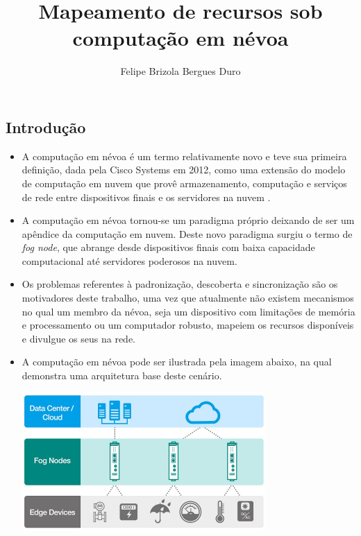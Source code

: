\documentclass[a0,portrait]{lab-poster}
\title{Mapeamento de recursos sob computação em névoa}
\author{Felipe Brizola Bergues Duro}
\begin{document}
\maketitle


\begin{multicols}{2} 
\section*{Introdução}
\Large
\justifying
\begin{itemize}

\item A computação em névoa é um termo relativamente novo e teve sua primeira definição, dada pela Cisco Systems em 2012, como uma extensão do modelo de computação em nuvem que provê armazenamento, computação e serviços de rede entre dispositivos finais e os servidores na nuvem \cite{DBLP:journals/corr/RomanLM16}.
\item A computação em névoa tornou-se um paradigma próprio deixando de ser um apêndice da computação em nuvem. Deste novo paradigma surgiu o termo de \textit{fog node}, que abrange desde dispositivos finais com baixa capacidade computacional até servidores poderosos na nuvem.
\item Os problemas referentes à padronização, descoberta e sincronização são os motivadores deste trabalho, uma vez que atualmente não existem mecanismos no qual um membro da névoa, seja um dispositivo com limitações de memória e processamento ou um computador robusto, mapeiem os recursos disponíveis e divulgue os seus na rede.
\item A computação em névoa pode ser ilustrada pela imagem abaixo, na qual demonstra uma arquitetura base deste cenário.

\begin{center}
\includegraphics[width=0.7\linewidth]{fig/fig1.pdf}
\end{center}


\end{itemize}
\end{multicols}
\end{document}
